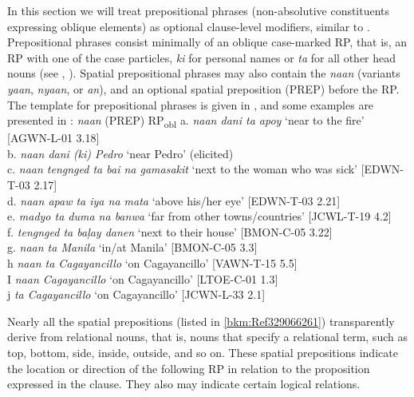 In this section we will treat prepositional phrases (non-absolutive constituents expressing oblique elements) as optional clause-level modifiers, similar to . Prepositional phrases consist minimally of an oblique case-marked RP, that is, an RP with one of the  case particles, \textit{ki} for personal names or \textit{ta} for all other head nouns (see , ). Spatial prepositional phrases may also contain the  \textit{naan} (variants \textit{yaan}, \textit{nyaan}, or \textit{an}), and an optional spatial preposition (PREP) before the RP. The template for prepositional phrases is given in , and some examples are presented in :
\ea
\label{bkm:Ref479920100}
\textit{naan} (PREP) RP\textsubscript{obl}
\z
\ea
\label{bkm:Ref117667676}
a.  \textit{naan dani ta apoy} ‘near to the fire’ [AGWN-L-01 3.18] \\
b.  \textit{naan dani (ki) Pedro} ‘near Pedro' (elicited) \\
c.  \textit{naan tengnged ta bai na gamasakit} ‘next to the woman who was sick’ [EDWN-T-03 2.17] \\
d.  \textit{naan apaw ta iya na mata} ‘above his/her eye’ [EDWN-T-03 2.21] \\
e.  \textit{madyo ta duma na banwa} ‘far from other towns/countries’ [JCWL-T-19 4.2] \\
f.  \textit{tengnged  ta baļay danen} ‘next to their house’ [BMON-C-05 3.22] \\
g.  \textit{naan ta Manila} ‘in/at Manila’ [BMON-C-05 3.3] \\
h  \textit{naan ta Cagayancillo} ‘on Cagayancillo’ [VAWN-T-15 5.5] \\
I  \textit{naan Cagayancillo} ‘on Cagayancillo’ [LTOE-C-01 1.3] \\
j  \textit{ta Cagayancillo} ‘on Cagayancillo’ [JCWN-L-33 2.1]
\z

Nearly all the spatial prepositions (listed in \ref{bkm:Ref329066261}) transparently derive from relational nouns, that is, nouns that specify a relational term, such as top, bottom, side, inside, outside, and so on. These spatial prepositions indicate the location or direction of the following RP in relation to the proposition expressed in the clause. They also may indicate certain logical relations.

